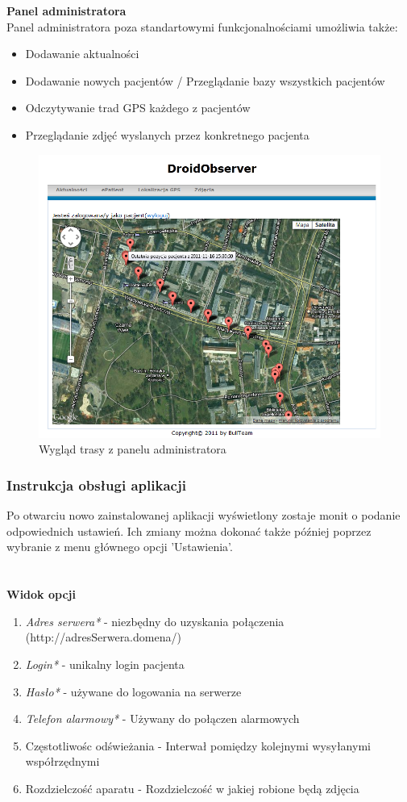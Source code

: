 \documentclass[11pt,a4paper]{article}
\begin{document}
{\bf Panel administratora}\\
Panel administratora poza standartowymi funkcjonalnościami umożliwia także:
\begin{itemize}
\item Dodawanie aktualności
\item Dodawanie nowych pacjentów / Przeglądanie bazy wszystkich pacjentów
\item Odczytywanie trad GPS każdego z pacjentów
\item Przeglądanie zdjęć wyslanych przez konkretnego pacjenta
\end{itemize}
\vspace {20pt}
\begin{figure}[h]
\centering
\includegraphics[scale=0.7]{route.png}   
\caption {Wygląd trasy z panelu administratora}
\end{figure}
\vspace {20pt}

\subsubsection{Instrukcja obsługi aplikacji}

Po otwarciu nowo zainstalowanej aplikacji wyświetlony zostaje monit o podanie odpowiednich ustawień.
Ich zmiany można dokonać także później poprzez wybranie z menu głównego opcji 'Ustawienia'.\\
\\\\
{\bf Widok opcji}
\begin{enumerate}
\item {\it Adres serwera*} - niezbędny do uzyskania połączenia (http://adresSerwera.domena/)
\item {\it Login*} - unikalny login pacjenta
\item {\it Hasło*} - używane do logowania na serwerze
\item {\it Telefon alarmowy*} - Używany do połączen alarmowych
\item Częstotliwośc odświeżania - Interwał pomiędzy kolejnymi wysyłanymi współrzędnymi
\item Rozdzielczość aparatu - Rozdzielczość w jakiej robione będą zdjęcia
\end{enumerate}
\end{document}
